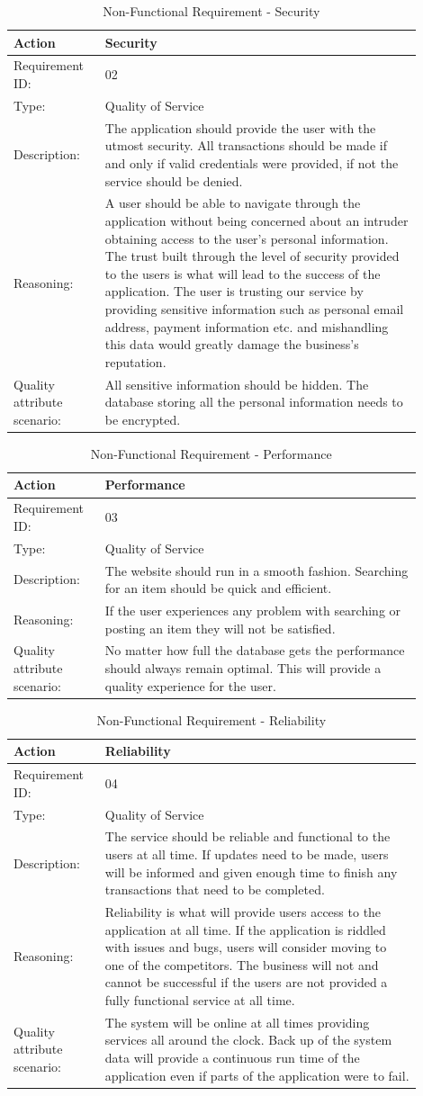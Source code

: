 \documentclass[11pt]{article}
\newcounter{use case ID}
\newcommand\addrow[2]{#1 & #2\\ \hline}
\newcounter{req ID}
\newcommand\tabularheadfsd[1]{
            \begin{table}[ht]
                \addtocounter{req ID}{1}
                \caption{Non-Functional Requirement \arabic{req ID} - #1}
                \vspace{0.2cm}
                \begin{tabular}{|p{0.2\linewidth}|p{0.70\linewidth}|}
                    \hline
                    \textbf{Action} & \textbf{#1} \\
                    \hline}
\newenvironment{requirement}{\tabularheadfsd}
                {\hline\end{tabular}\end{table}}
\begin{document}
\begin{requirement}{Security}
    \addrow{Requirement ID:}{02}
    \addrow{Type:}{Quality of Service}
    \addrow{Description:}{The application should provide the user with the utmost security. All transactions should be made if and only if valid credentials were provided, if not the service should be denied.}
    \addrow{Reasoning:}{A user should be able to navigate through the application without being concerned about an intruder obtaining access to the user's personal \index{information}information. The trust built through the level of security provided to the users is what will lead to the success of the application. The user is trusting our service by providing sensitive information such as personal email address, \index{payment}payment information etc. and mishandling this \index{data}data would greatly damage the business's reputation.  }
    \addrow{Quality attribute scenario:}{All sensitive information should be hidden. The database storing all the personal information needs to be encrypted.}
\end{requirement}

\begin{requirement}{Performance}
    \addrow{Requirement ID:}{03}
    \addrow{Type:}{Quality of Service}
    \addrow{Description:}{The website should run in a smooth fashion. Searching for an item should be quick and efficient.}
    \addrow{Reasoning:}{If the user experiences any problem with searching or posting an item they will not be satisfied.}
    \addrow{Quality attribute scenario:}{No matter how full the database gets the performance should always remain optimal. This will provide a quality experience for the user.}
\end{requirement}

\begin{requirement}{Reliability}
    \addrow{Requirement ID:}{04}
    \addrow{Type:}{Quality of Service}
    \addrow{Description:}{The service should be reliable and functional to the users at all time. If updates need to be made, users will be informed and given enough time to finish any transactions that need to be completed. }
    \addrow{Reasoning:}{Reliability is what will provide users access to the application at all time. If the application is riddled with issues and bugs, users will consider moving to one of the competitors. The business will not and cannot be successful if the users are not provided a fully functional service at all time. }
    \addrow{Quality attribute scenario:}{The system will be online at all times providing services all around the clock. Back up of the system \index{data}data will provide a continuous run time of the application even if parts of the application were to fail.}
\end{requirement}
\end{document}
